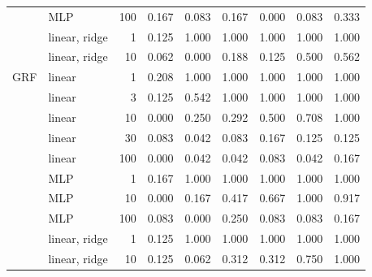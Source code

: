 \documentclass{article}
\begin{document}
\begin{table}[ht]
\begin{tabular}{llrcccccc}
 & MLP & 100 & 0.167 & 0.083 & 0.167 & 0.000 & 0.083 & 0.333 \\
 & linear, ridge & 1 & 0.125 & 1.000 & 1.000 & 1.000 & 1.000 & 1.000 \\
 & linear, ridge & 10 & 0.062 & 0.000 & 0.188 & 0.125 & 0.500 & 0.562 \\
\midrule
GRF & linear & 1 & 0.208 & 1.000 & 1.000 & 1.000 & 1.000 & 1.000 \\
 & linear & 3 & 0.125 & 0.542 & 1.000 & 1.000 & 1.000 & 1.000 \\
 & linear & 10 & 0.000 & 0.250 & 0.292 & 0.500 & 0.708 & 1.000 \\
 & linear & 30 & 0.083 & 0.042 & 0.083 & 0.167 & 0.125 & 0.125 \\
 & linear & 100 & 0.000 & 0.042 & 0.042 & 0.083 & 0.042 & 0.167 \\
 & MLP & 1 & 0.167 & 1.000 & 1.000 & 1.000 & 1.000 & 1.000 \\
 & MLP & 10 & 0.000 & 0.167 & 0.417 & 0.667 & 1.000 & 0.917 \\
 & MLP & 100 & 0.083 & 0.000 & 0.250 & 0.083 & 0.083 & 0.167 \\
 & linear, ridge & 1 & 0.125 & 1.000 & 1.000 & 1.000 & 1.000 & 1.000 \\
 & linear, ridge & 10 & 0.125 & 0.062 & 0.312 & 0.312 & 0.750 & 1.000 \\
\bottomrule
\end{tabular}
\end{table}
\end{document}
